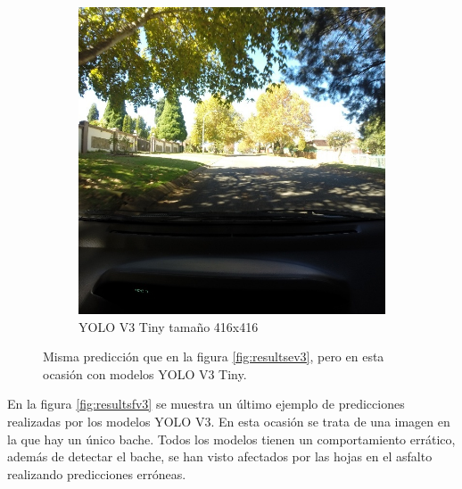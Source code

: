 \begin{figure}[H]
\begin{subfigure}[h]{0.45\linewidth}
		\includegraphics[width=\linewidth]{images/results_e_yolo_v3_tiny_416.jpg}
		\caption{YOLO V3 Tiny tamaño 416x416}
	\end{subfigure}
	\caption{Misma predicción que en la figura \ref{fig:resultsev3}, pero en esta ocasión con modelos YOLO V3 Tiny.}
	\label{fig:resultsev3tiny}
\end{figure}

En la figura \ref{fig:resultsfv3} se muestra un último ejemplo de predicciones realizadas por los modelos YOLO V3. En esta ocasión se trata de una imagen en la que hay un único bache. Todos los modelos tienen un comportamiento errático, además de detectar el bache, se han visto afectados por las hojas en el asfalto realizando predicciones erróneas.

